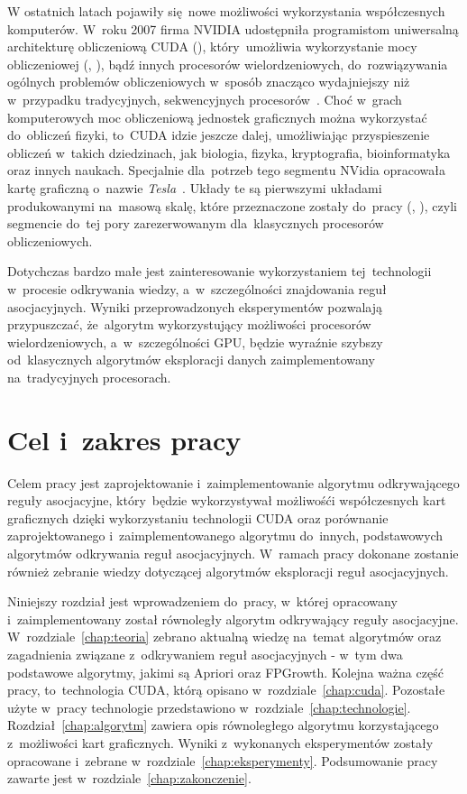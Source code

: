 W ostatnich latach pojawiły się~nowe możliwości wykorzystania współczesnych komputerów. W~roku 2007 firma NVIDIA udostępniła programistom uniwersalną architekturę obliczeniową CUDA (), który~umożliwia wykorzystanie mocy obliczeniowej  (, ), bądź innych procesorów wielordzeniowych, do~rozwiązywania ogólnych problemów obliczeniowych w~sposób znacząco wydajniejszy niż w~przypadku tradycyjnych, sekwencyjnych procesorów~\cite{cuda:zone}. Choć w~grach komputerowych moc obliczeniową jednostek graficznych można wykorzystać do~obliczeń fizyki, to~CUDA idzie jeszcze dalej, umożliwiając przyspieszenie obliczeń w~takich dziedzinach, jak biologia, fizyka, kryptografia, bioinformatyka oraz innych naukach. Specjalnie dla~potrzeb tego segmentu NVidia opracowała kartę graficzną o~nazwie \emph{Tesla}~\cite{cuda:tesla}. Układy te są pierwszymi układami produkowanymi na~masową skalę, które przeznaczone zostały do~pracy  (, ), czyli segmencie do~tej pory zarezerwowanym dla~klasycznych procesorów obliczeniowych.

Dotychczas bardzo małe jest zainteresowanie wykorzystaniem tej~technologii w~procesie odkrywania wiedzy, a~w~szczególności znajdowania reguł asocjacyjnych. Wyniki przeprowadzonych eksperymentów pozwalają przypuszczać, że~algorytm wykorzystujący możliwości procesorów wielordzeniowych, a~w~szczególności GPU, będzie wyraźnie szybszy od~klasycznych algorytmów eksploracji danych zaimplementowany na~tradycyjnych procesorach.

\section{Cel i~zakres pracy}
Celem pracy jest zaprojektowanie i~zaimplementowanie algorytmu odkrywającego reguły asocjacyjne, który~będzie wykorzystywał możliwośći współczesnych kart graficznych dzięki wykorzystaniu technologii CUDA oraz porównanie zaprojektowanego i~zaimplementowanego algorytmu do~innych, podstawowych algorytmów odkrywania reguł asocjacyjnych. W~ramach pracy dokonane zostanie również zebranie wiedzy dotyczącej algorytmów eksploracji reguł asocjacyjnych.

Niniejszy rozdział jest wprowadzeniem do~pracy, w~której opracowany i~zaimplementowany został równoległy algorytm odkrywający reguły asocjacyjne. W~rozdziale~\ref{chap:teoria} zebrano aktualną wiedzę na~temat algorytmów oraz zagadnienia związane z~odkrywaniem reguł asocjacyjnych - w~tym dwa podstawowe algorytmy, jakimi są Apriori oraz FPGrowth. Kolejna ważna część pracy, to~technologia CUDA, którą opisano w~rozdziale~\ref{chap:cuda}. Pozostałe użyte w~pracy technologie przedstawiono w~rozdziale~\ref{chap:technologie}. Rozdział~\ref{chap:algorytm} zawiera opis równoległego algorytmu korzystającego z~możliwości kart graficznych. Wyniki z~wykonanych eksperymentów zostały opracowane i~zebrane w~rozdziale~\ref{chap:eksperymenty}. Podsumowanie pracy zawarte jest w~rozdziale~\ref{chap:zakonczenie}.